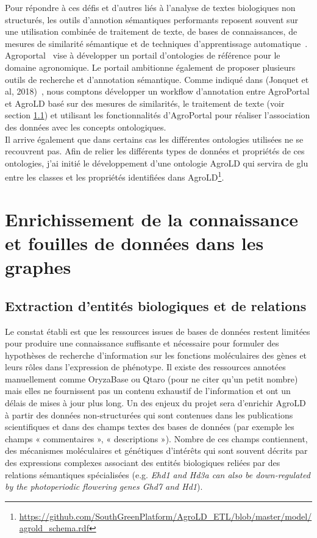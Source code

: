 Pour répondre à ces défis et d'autres liés à l'analyse de textes biologiques non structurés, les outils d'annotion sémantiques performants reposent souvent sur une utilisation combinée de traitement de texte, de bases de connaissances, de mesures de similarité sémantique et de techniques d'apprentissage automatique~\cite{Jovanovic2017a}. Agroportal~\cite{Jonquet2018} vise à développer un portail d'ontologies de référence pour le domaine agronomique. Le portail ambitionne également de proposer plusieurs outils de recherche et d'annotation sémantique. Comme indiqué dans (Jonquet et al, 2018)~\cite{Jonquet2018}, nous comptons développer un workflow d’annotation entre AgroPortal et AgroLD basé sur des mesures de similarités, le traitement de texte (voir section \ref{NLP}) et utilisant les fonctionnalités d’AgroPortal pour réaliser l’association des données avec les concepts ontologiques. \\

Il arrive également que dans certains cas les différentes ontologies utilisées ne se recouvrent pas. Afin de relier les différents types de données et propriétés de ces ontologies, j'ai initié le développement d’une ontologie AgroLD qui servira de glu entre les classes et les propriétés identifiées dans AgroLD\footnote{\url{https://github.com/SouthGreenPlatform/AgroLD_ETL/blob/master/model/agrold\_schema.rdf}}. \\


\section{Enrichissement de la connaissance et fouilles de données dans les graphes}

\subsection{Extraction d’entités biologiques et de relations}
\label{NLP}

Le constat établi est que les ressources issues de bases de données restent limitées pour produire une connaissance suffisante et nécessaire pour formuler des hypothèses de recherche d’information sur les fonctions moléculaires des gènes et leurs rôles dans l’expression de phénotype. Il existe des ressources annotées manuellement comme OryzaBase ou Qtaro (pour ne citer qu'un petit nombre) mais elles ne fournissent pas un contenu exhaustif de l'information et ont un délais de mises à jour plus long. Un des enjeux du projet sera d'enrichir AgroLD à partir des données non-structurées qui sont contenues dans les publications scientifiques et dans des champs textes des bases de données (par exemple les champs « commentaires », « descriptions »). Nombre de ces champs contiennent, des mécanismes moléculaires et génétiques d’intérêts qui sont souvent décrits par des expressions complexes associant des entités biologiques reliées par des relations sémantiques spécialisées (e.g. \textit{Ehd1 and Hd3a can also be down-regulated by the photoperiodic flowering genes Ghd7 and Hd1}).\\

